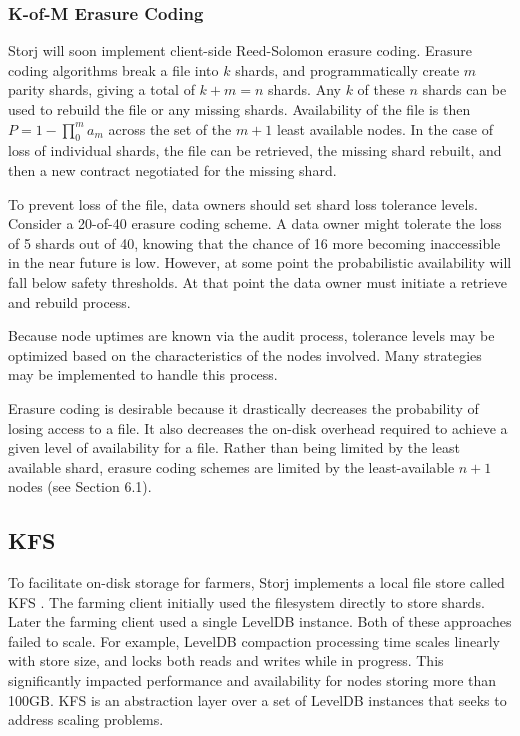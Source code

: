\documentclass[a4paper,10pt]{article}
\begin{document}
\subsubsection{K-of-M Erasure Coding}
Storj will soon implement client-side Reed-Solomon erasure coding. Erasure coding algorithms break a file into $ k $ shards, and programmatically create $ m $ parity shards, giving a total of $ k + m = n $ shards. Any $ k $ of these $ n $ shards can be used to rebuild the file or any missing shards. Availability of the file is then $ P = 1 - \prod_{0}^{m} a_{m} $  across the set of the $m + 1$ least available nodes. In the case of loss of individual shards, the file can be retrieved, the missing shard rebuilt, and then a new contract negotiated for the missing shard.

To prevent loss of the file, data owners should set shard loss tolerance levels. Consider a 20-of-40 erasure coding scheme. A data owner might tolerate the loss of 5 shards out of 40, knowing that the chance of 16 more becoming inaccessible in the near future is low. However, at some point the probabilistic availability will fall below safety thresholds. At that point the data owner must initiate a retrieve and rebuild process.

Because node uptimes are known via the audit process, tolerance levels may be optimized based on the characteristics of the nodes involved. Many strategies may be implemented to handle this process.

Erasure coding is desirable because it drastically decreases the probability of losing access to a file. It also decreases the on-disk overhead required to achieve a given level of availability for a file. Rather than being limited by the least available shard, erasure coding schemes are limited by the least-available $ n + 1 $ nodes (see Section 6.1).

\subsection{KFS}
To facilitate on-disk storage for farmers, Storj implements a local file store called KFS \cite{12}. The farming client initially used the filesystem directly to store shards. Later the farming client used a single LevelDB instance. Both of these approaches failed to scale. For example, LevelDB compaction processing time scales linearly with store size, and locks both reads and writes while in progress. This significantly impacted performance and availability for nodes storing more than 100GB. KFS is an abstraction layer over a set of LevelDB instances that seeks to address scaling problems.
\end{document}
